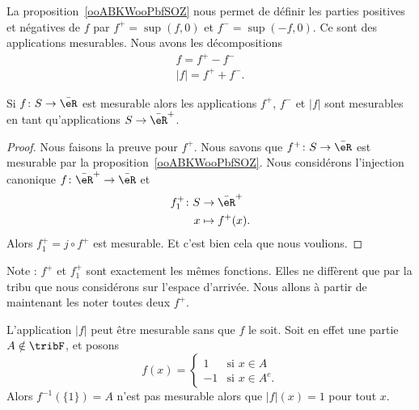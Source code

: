\begin{normaltext}
    La proposition~\ref{ooABKWooPbfSOZ} nous permet de définir les parties positives et négatives de \( f\) par \( f^+=\sup(f,0)\) et \( f^-=\sup(-f,0)\). Ce sont des applications mesurables. Nous avons les décompositions
    \begin{subequations}
        \begin{align}
            f=f^+-f^-\\
            | f |=f^++f^-.
        \end{align}
    \end{subequations}
\end{normaltext}

\begin{corollary}       \label{CORooNXYUooEcvDlP}
    Si \( f\colon S\to \bar \eR\) est mesurable alors les applications \( f^+\), \( f^-\) et \( | f |\) sont mesurables en tant qu'applications \( S\to\bar \eR^+\).
\end{corollary}

\begin{proof}
    Nous faisons la preuve pour \( f^+\). Nous savons que \( f^+\colon S\to \bar \eR\) est mesurable par la proposition~\ref{ooABKWooPbfSOZ}. Nous considérons l'injection canonique \( f\colon \bar \eR^+\to \bar \eR\) et
    \begin{equation}
        \begin{aligned}
            f_1^+\colon S&\to \bar \eR^+ \\
            x&\mapsto f^+(x).
        \end{aligned}
    \end{equation}
    Alors \( f_1^+=j\circ f^+\) est mesurable. Et c'est bien cela que nous voulions.

\end{proof}
Note : \( f^+\) et \( f_1^+\) sont exactement les mêmes fonctions. Elles ne diffèrent que par la tribu que nous considérons sur l'espace d'arrivée. Nous allons à partir de maintenant les noter toutes deux \( f^+\).

\begin{remark}
    L'application \( | f |\) peut être mesurable sans que \( f\) le soit. Soit en effet une partie \( A\notin \tribF\), et posons
    \begin{equation}
        f(x)=\begin{cases}
            1    &   \text{si } x\in A\\
            -1    &    \text{si } x\in A^c.
        \end{cases}
    \end{equation}
    Alors \( f^{-1}(\{ 1 \})=A\) n'est pas mesurable alors que \( | f |(x)=1\) pour tout \( x\).
\end{remark}

